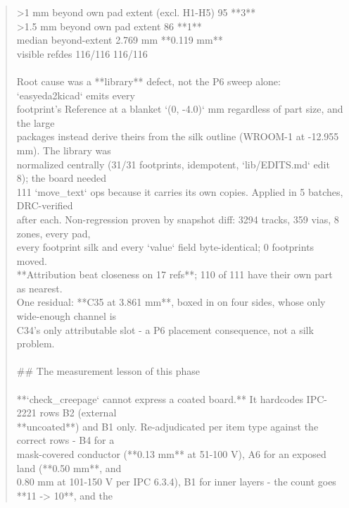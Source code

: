 \documentclass[11pt,a4paper]{article}
\begin{document}
\begin{quote}
\textbar{} \textgreater{}1 mm beyond own pad extent (excl. H1-H5) \textbar{} 95 \textbar{} {*}{*}3{*}{*} \textbar{}\\
\textbar{} \textgreater{}1.5 mm beyond own pad extent \textbar{} 86 \textbar{} {*}{*}1{*}{*} \textbar{}\\
\textbar{} median beyond-extent \textbar{} 2.769 mm \textbar{} {*}{*}0.119 mm{*}{*} \textbar{}\\
\textbar{} visible refdes \textbar{} 116/116 \textbar{} 116/116 \textbar{}\\
~\\
Root cause was a {*}{*}library{*}{*} defect, not the P6 sweep alone: `easyeda2kicad` emits every\\
footprint's Reference at a blanket `(0, -4.0)` mm regardless of part size, and the large\\
packages instead derive theirs from the silk outline (WROOM-1 at -12.955 mm). The library was\\
normalized centrally (31/31 footprints, idempotent, `lib/EDITS.md` edit 8); the board needed\\
111 `move\_text` ops because it carries its own copies. Applied in 5 batches, DRC-verified\\
after each. Non-regression proven by snapshot diff: 3294 tracks, 359 vias, 8 zones, every pad,\\
every footprint silk and every `value` field byte-identical; 0 footprints moved.\\
{*}{*}Attribution beat closeness on 17 refs{*}{*}; 110 of 111 have their own part as nearest.\\
One residual: {*}{*}C35 at 3.861 mm{*}{*}, boxed in on four sides, whose only wide-enough channel is\\
C34's only attributable slot - a P6 placement consequence, not a silk problem.\\
~\\
\#\# The measurement lesson of this phase\\
~\\
{*}{*}`check\_creepage` cannot express a coated board.{*}{*} It hardcodes IPC-2221 rows B2 (external\\
{*}{*}uncoated{*}{*}) and B1 only. Re-adjudicated per item type against the correct rows - B4 for a\\
mask-covered conductor ({*}{*}0.13 mm{*}{*} at 51-100 V), A6 for an exposed land ({*}{*}0.50 mm{*}{*}, and\\
0.80 mm at 101-150 V per IPC 6.3.4), B1 for inner layers - the count goes {*}{*}11 -\textgreater{} 10{*}{*}, and the\\

\end{quote}
\end{document}
